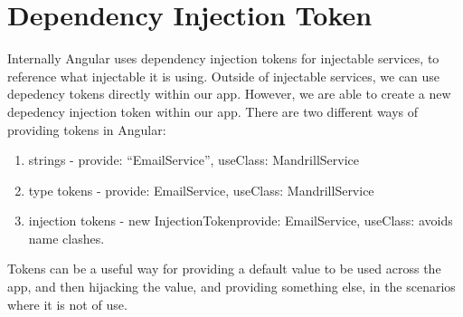 \section{ Dependency Injection Token }
Internally Angular uses dependency injection tokens for injectable services, to
reference what injectable it is using. Outside of injectable services, we can
use depedency tokens directly within our app. However, we are able to create a
new depedency injection token within our app. There are two different ways of
providing tokens in Angular:
\begin{enumerate}
  \item strings - {provide: ``EmailService'', useClass: MandrillService}
  \item type tokens - {provide: EmailService, useClass: MandrillService}
  \item injection tokens - new InjectionToken{provide: EmailService, useClass:}
  avoids name clashes.
\end{enumerate}

Tokens can be a useful way for providing a default value to be used across the 
app, and then hijacking the value, and providing something else, in the 
scenarios where it is not of use. 
